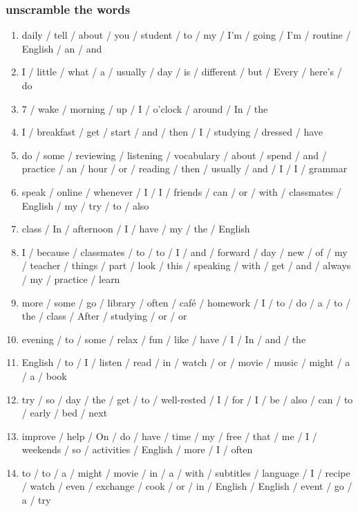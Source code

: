 \documentclass[]{article} %
\begin{document}
\subsubsection*{unscramble the words}
\fi 
\begin{enumerate}
	\item daily / tell / about / you / student / to / my / I'm / going / I'm / routine / English / an / and\\
	\item I / little / what / a / usually / day / is / different / but / Every / here's / do\\
	\item 7 / wake / morning / up / I / o'clock / around / In / the\\
	\item I / breakfast / get / start / and / then / I / studying / dressed / have\\
	\item do / some / reviewing / listening / vocabulary / about / spend / and / practice / an / hour / or / reading / then / usually / and / I / I / grammar\\
	\item speak / online / whenever / I / I / friends / can / or / with / classmates / English / my / try / to / also\\
	\item class / In / afternoon / I / have / my / the / English\\
	\item I / because / classmates / to / to / I / and / forward / day / new / of / my / teacher / things / part / look / this / speaking / with / get / and / always / my / practice / learn\\
	\item more / some / go / library / often / café / homework / I / to / do / a / to / the / class / After / studying / or / or\\
	\item evening / to / some / relax / fun / like / have / I / In / and / the\\
	\item English / to / I / listen / read / in / watch / or / movie / music / might / a / a / book\\
	\item try / so / day / the / get / to / well-rested / I / for / I / be / also / can / to / early / bed / next\\
	\item improve / help / On / do / have / time / my / free / that / me / I / weekends / so / activities / English / more / I / often\\
	\item to / to / a / might / movie / in / a / with / subtitles / language / I / recipe / watch / even / exchange / cook / or / in / English / English / event / go / a / try\\
\end{enumerate}
\end{document}
